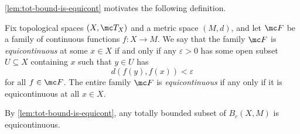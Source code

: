 \documentclass[../notes.tex]{subfiles}
\begin{document}
\autoref{lem:tot-bound-is-equicont} motivates the following definition.
\begin{definition}[Equicontinuous]
	Fix topological spaces $(X,\mc T_X)$ and a metric space $(M,d)$, and let $\mc F$ be a family of continuous functions $f\colon X\to M$. We say that the family $\mc F$ is \textit{equicontinuous} at some $x\in X$ if and only if any $\varepsilon>0$ has some open subset $U\subseteq X$ containing $x$ such that $y\in U$ has
	\[d(f(y),f(x))<\varepsilon\]
	for all $f\in \mc F$. The entire family $\mc F$ is \textit{equicontinuous} if any only if it is equicontinuous at all $x\in X$.
\end{definition}
\begin{example}
	By \autoref{lem:tot-bound-is-equicont}, any totally bounded subset of $B_c(X,M)$ is equicontinuous.
\end{example}
\end{document}
